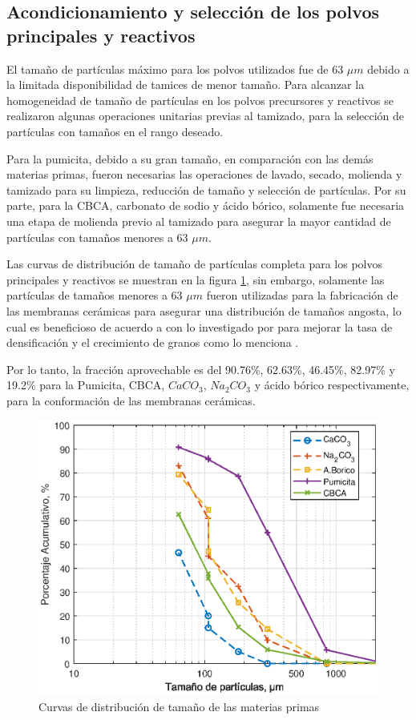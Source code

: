 \documentclass{article}
\begin{document}
\subsection{Acondicionamiento y selección de los polvos principales y reactivos}

El tamaño de partículas máximo para los polvos utilizados fue de 
63 $\mu m$ debido a la limitada disponibilidad de tamices de menor 
tamaño. Para alcanzar la homogeneidad de tamaño de partículas en los 
polvos precursores y reactivos se realizaron algunas operaciones 
unitarias previas al tamizado, para la selección de partículas con 
tamaños en el rango deseado. 

Para la pumicita, debido a su gran tamaño, en comparación con las 
demás materias primas, fueron necesarias las operaciones de lavado, 
secado, molienda y tamizado para su limpieza, reducción de tamaño y 
selección de partículas. Por su parte, para la CBCA, carbonato de 
sodio y ácido bórico, solamente fue necesaria una etapa de molienda 
previo al tamizado para asegurar la mayor cantidad de partículas con 
tamaños menores a 63 $\mu m$. 

Las curvas de distribución de tamaño de partículas completa para los 
polvos principales y reactivos se muestran en la figura \ref{fig:Distribucion_Particulas}, 
sin embargo, solamente las partículas de tamaños menores a 63 $\mu m$ 
fueron utilizadas para la fabricación de las membranas cerámicas para 
asegurar una distribución de tamaños angosta, lo cual es beneficioso de 
acuerdo a con lo investigado por \textcite{Lin1995} para mejorar la tasa 
de densificación y el crecimiento de granos como lo menciona
\textcite{Kang2020}. 

Por lo tanto, la fracción aprovechable es del 
90.76\%, 62.63\%, 46.45\%, 82.97\% y 19.2\% para la Pumicita, 
CBCA, $CaCO_3$, $Na_2CO_3$ y ácido bórico respectivamente, para la 
conformación de las membranas cerámicas. 

\begin{figure}[ht]
    \centering
    \includegraphics[width=0.7\linewidth]{Graphics/ParticleDistributionC.eps}
    \caption{Curvas de distribución de tamaño de las materias primas}
    \label{fig:Distribucion_Particulas}
\end{figure}
\end{document}
